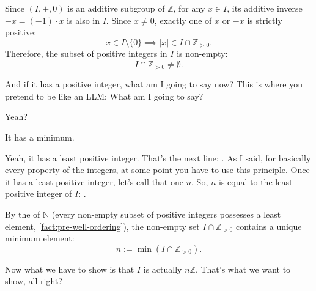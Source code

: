 \begin{proofWrapper}
\begin{content}
Since $(I, +, 0)$ is an additive subgroup of $\mathbb{Z}$, for any $x \in I$, its additive inverse $-x = (-1) \cdot x$ is also in $I$. Since $x \neq 0$, exactly one of $x$ or $-x$ is strictly positive:
\[
x \in I \setminus \{0\} \implies |x| \in I \cap \mathbb{Z}_{>0}.
\]
Therefore, the subset of positive integers in $I$ is non-empty:
\[
I \cap \mathbb{Z}_{>0} \neq \emptyset.
\]
\end{content}

\begin{speech}[00:53:05 - 00:53:19]
And if it has a positive integer, what am I going to say now? This is where you pretend to be like an LLM: What am I going to say?

Yeah?
\end{speech}

\begin{student}
It has a minimum.
\end{student}

\begin{speech}[00:53:19 - 00:53:46]
Yeah, it has a least positive integer. That's the next line:  . As I said, for basically every property of the integers, at some point you have to use this principle. Once it has a least positive integer, let's call that one $n$. So, $n$ is equal to the least positive integer of $I$: .
\end{speech}

\begin{content}
By the  of $\mathbb{N}$ (every non-empty subset of positive integers possesses a least element, \cref{fact:pre-well-ordering}), the non-empty set $I \cap \mathbb{Z}_{>0}$ contains a unique minimum element:
\begin{equation}\label{eq:n-minimal-pos}
n := \min(I \cap \mathbb{Z}_{>0}).
\end{equation}
\end{content}

\begin{speech}[00:53:46 - 00:54:50]
Now what we have to show is that $I$ is actually $n\mathbb{Z}$. That's what we want to show, all right? 


\end{speech}
\end{proofWrapper}
